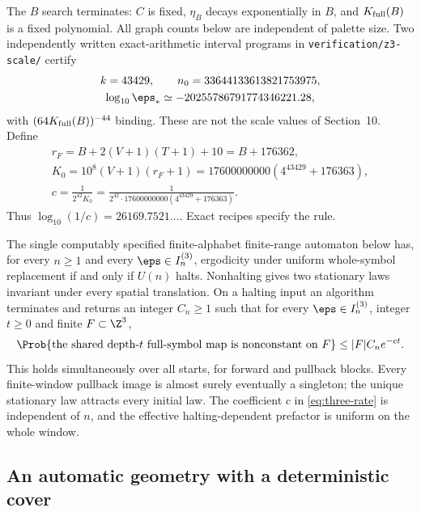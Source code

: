 The $B$ search terminates: $C$ is fixed, $\eta_B$ decays exponentially in $B$, and $K_{\rm full}(B)$ is a fixed polynomial. All graph counts below are independent of palette size. Two independently written exact-arithmetic interval programs in \texttt{verification/z3-scale/} certify
\begin{equation}\label{eq:three-scale}
 \begin{gathered}
 k=43429,\qquad n_0=33644133613821753975,\\
 \log_{10}\eps_*\simeq-20255786791774346221.28,
 \end{gathered}
\end{equation}
with $(64K_{\rm full}(B))^{-44}$ binding. These are not the scale values of Section~10. Define
\begin{equation}\label{eq:three-rate}
 \begin{gathered}
 r_F=B+2(V+1)(T+1)+10=B+176362,\\
 K_0=10^8(V+1)(r_F+1)=17600000000(4^{43429}+176363),\\
 c=\frac1{2^{42}K_0}
   =\frac1{2^{42}\cdot17600000000(4^{43429}+176363)}.
 \end{gathered}
\end{equation}
Thus $\log_{10}(1/c)=26169.7521\ldots$. Exact recipes specify the rule.

\begin{theorem}\label{thm:three}
The single computably specified finite-alphabet finite-range automaton below has, for every $n\ge1$ and every $\eps\in I_n^{(3)}$, ergodicity under uniform whole-symbol replacement if and only if $U(n)$ halts. Nonhalting gives two stationary laws invariant under every spatial translation. On a halting input an algorithm terminates and returns an integer $C_n\ge1$ such that for every $\eps\in I_n^{(3)}$, integer $t\ge0$ and finite $F\subset\Z^3$,
\[
 \Prob\{\text{the shared depth-$t$ full-symbol map is nonconstant on }F\}
 \le |F|C_ne^{-ct}.
\]
This holds simultaneously over all starts, for forward and pullback blocks. Every finite-window pullback image is almost surely eventually a singleton; the unique stationary law attracts every initial law. The coefficient $c$ in \eqref{eq:three-rate} is independent of $n$, and the effective halting-dependent prefactor is uniform on the whole window.
\end{theorem}

\subsection{An automatic geometry with a deterministic cover}

